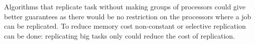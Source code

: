 \documentclass[10pt, conference, compsocconf]{IEEEtran}
\begin{document}
  Algorithms that replicate task without making groups of processors could give better guarantees as there would be no restriction on the processors where a job can be replicated. To reduce memory cost non-constant or selective replication can be done: replicating big tasks only could reduce the cost of  replication. 



%
%
%









\end{document}
